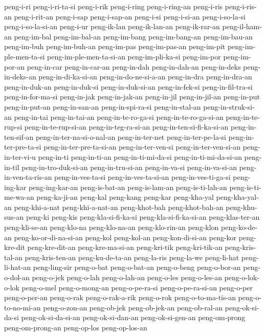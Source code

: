 {peng-i-ri peng-i-ri-ta-si peng-i-rik peng-i-ring peng-i-ring-an peng-i-ris
peng-i-ris-an peng-i-rit-an peng-i-sap peng-i-sap-an peng-i-si
peng-i-si-an peng-i-so-la-si peng-i-so-la-si-an peng-i-ur peng-ik-lan
peng-ik-lan-an peng-ik-rar-an peng-il-ham-an peng-im-bal peng-im-bal-an
peng-im-bang peng-im-bang-an peng-im-bau-an peng-im-buh peng-im-buh-an
peng-im-pas peng-im-pas-an peng-im-pit peng-im-ple-men-ta-si
peng-im-ple-men-ta-si-an peng-im-pli-ka-si peng-im-por peng-im-por-an
peng-in-car peng-in-car-an peng-in-dah peng-in-dah-an peng-in-deks
peng-in-deks-an peng-in-di-ka-si-an peng-in-do-ne-si-a-an peng-in-dra
peng-in-dra-an peng-in-duk-an peng-in-duk-si peng-in-duk-si-an
peng-in-fek-si peng-in-fil-tra-si peng-in-for-ma-si peng-in-jak
peng-in-jak-an peng-in-jil peng-in-jil-an peng-in-put peng-in-put-an
peng-in-san-an peng-in-spi-ra-si peng-in-stal-an peng-in-struk-si-an
peng-in-tai peng-in-tai-an peng-in-te-ro-ga-si peng-in-te-ro-ga-si-an
peng-in-te-rup-si peng-in-te-rup-si-an peng-in-teg-ra-si-an
peng-in-ten-si-fi-ka-si-an peng-in-ten-sif-an peng-in-ter-na-si-o-nal-an
peng-in-ter-net peng-in-ter-pe-la-si peng-in-ter-pre-ta-si
peng-in-ter-pre-ta-si-an peng-in-ter-ven-si peng-in-ter-ven-si-an
peng-in-ter-vi-u peng-in-ti peng-in-ti-an peng-in-ti-mi-da-si
peng-in-ti-mi-da-si-an peng-in-til peng-in-tro-duk-si-an peng-in-tru-si-an
peng-in-va-si peng-in-va-si-an peng-in-ven-ta-ris-an peng-in-ves-ta-si
peng-in-ves-ta-si-an peng-in-ves-ti-ga-si peng-ing-kar peng-ing-kar-an
peng-is-bat-an peng-is-lam-an peng-is-ti-lah-an peng-is-ti-me-wa-an
peng-ka-ji-an peng-kal peng-kang peng-kar peng-kha-yal peng-kha-yal-an
peng-khi-a-nat peng-khi-a-nat-an peng-khot-bah peng-khot-bah-an
peng-khu-sus-an peng-ki peng-kis peng-kla-si-fi-ka-si
peng-kla-si-fi-ka-si-an peng-klas-ter-an peng-kli-se-an peng-klo-na
peng-klo-na-an peng-klo-rin-an peng-klon peng-ko-de-an
peng-ko-or-di-na-si-an peng-kol peng-kol-an peng-kon-di-si-an peng-kor
peng-kre-dit peng-kre-dit-an peng-kre-ma-si-an peng-kri-tik
peng-kri-tik-an peng-kris-tal-an peng-kris-ten-an peng-ku-de-ta-an
peng-la-ris peng-la-we peng-li-hat peng-li-hat-an peng-ling-sir peng-o-bat
peng-o-bat-an peng-o-beng peng-o-bor-an peng-o-dol-an peng-o-jek
peng-o-lah peng-o-lah-an peng-o-les peng-o-les-an peng-o-lok-o-lok
peng-o-mel peng-o-mong-an peng-o-pe-ra-si peng-o-pe-ra-si-an peng-o-per
peng-o-per-an peng-o-rak peng-o-rak-a-rik peng-o-rok peng-o-to-ma-tis-an
peng-o-to-no-mi-an peng-o-zon-an peng-ob-jek peng-ob-jek-an peng-ob-ral-an
peng-ok-si-da-si peng-ok-si-da-si-an peng-ok-si-dan-an peng-ok-si-gen-an
peng-om-prong peng-om-prong-an peng-op-los peng-op-los-an
}

